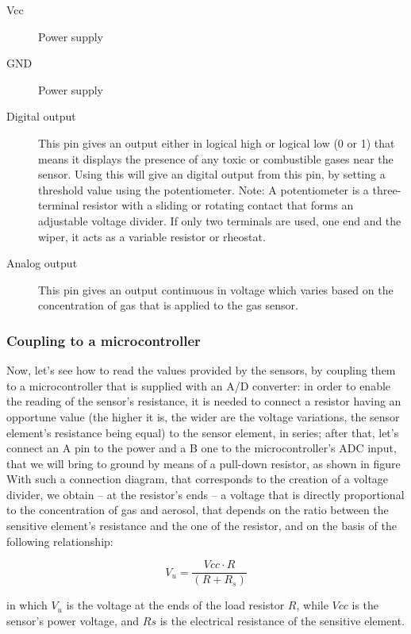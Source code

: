 \documentclass{article}\usepackage[]{graphicx}\usepackage[]{color}
\begin{document}
\begin{description}
  \item[Vcc] Power supply
  \item[GND] Power supply
  \item[Digital output] This pin gives an output either in logical high or logical low (0 or 1) that means it displays the presence of any toxic or combustible gases near the sensor. Using this will give an digital output from this pin, by setting a threshold value using the potentiometer. Note: A potentiometer is a three-terminal resistor with a sliding or rotating contact that forms an adjustable voltage divider. If only two terminals are used, one end and the wiper, it acts as a variable resistor or rheostat.
  \item[Analog output] This pin gives an output continuous in voltage which varies based on the concentration of gas that is applied to the gas sensor.
\end{description}


\subsubsection{Coupling to a microcontroller}
Now, let's see how to read the values provided by the sensors, by coupling them to a microcontroller that is supplied with an A/D converter: in order to enable the reading of the sensor's resistance, it is needed to connect a resistor having an opportune value (the higher it is, the wider are the voltage variations, the sensor element's resistance being equal) to the sensor element, in series; after that, let's connect an A pin to the power and a B one to the microcontroller's ADC input, that we will bring to ground by means of a pull-down resistor, as shown in figure With such a connection diagram, that corresponds to the creation of a voltage divider, we obtain – at the resistor's ends – a voltage that is directly proportional to the concentration of gas and aerosol, that depends on the ratio between the sensitive element's resistance and the one of the resistor, and on the basis of the following relationship:

\begin{equation} 
V_u = \frac{Vcc \cdot R}{(R+R_s)}
\end{equation}
 
in which $V_u$ is the voltage at the ends of the load resistor $R$, while $Vcc$ is the sensor's power voltage, and $Rs$ is the electrical resistance of the sensitive element.
\end{document}
